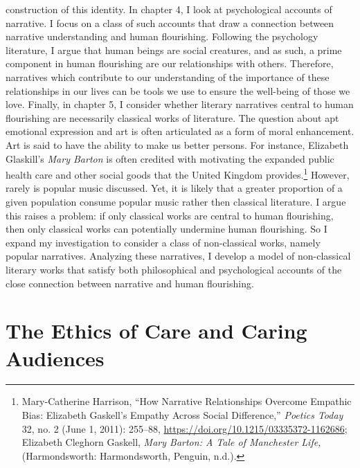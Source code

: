 \documentclass[phdthesis,12pt,final,a4paper]{wuthesis}
\theoremstyle{definition}
\theoremstyle{definition}
\theoremstyle{definition}
\theoremstyle{definition}
\theoremstyle{remark}
\begin{document}
construction of this identity. In chapter 4, I look at psychological accounts of narrative. I focus on a class of such accounts that draw a connection between narrative understanding and human flourishing. Following the psychology literature, I argue that human beings are social creatures, and as such, a prime component in human flourishing are our relationships with others. Therefore, narratives which contribute to our understanding of the importance of these relationships in our lives can be tools we use to ensure the well-being of those we love. Finally, in chapter 5, I consider whether literary narratives central to human flourishing are necessarily classical works of literature. The question about apt emotional expression and art is often articulated as a form of moral enhancement. Art is said to have the ability to make us better persons. For instance, Elizabeth Glaskill's \emph{Mary Barton} is often credited with motivating the expanded public health care and other social goods that the United Kingdom provides.\footnote{Mary-Catherine Harrison, {``How {Narrative Relationships Overcome Empathic Bias}: {Elizabeth Gaskell}'s {Empathy} Across {Social Difference},''} \emph{Poetics Today} 32, no. 2 (June 1, 2011): 255--88, \url{https://doi.org/10.1215/03335372-1162686}; Elizabeth Cleghorn Gaskell, \emph{Mary Barton: A Tale of Manchester Life,} (Harmondsworth: Harmondsworth, Penguin, n.d.).} However, rarely is popular music discussed. Yet, it is likely that a greater proportion of a given population consume popular music rather then classical literature. I argue this raises a problem: if only classical works are central to human flourishing, then only classical works can potentially undermine human flourishing. So I expand my investigation to consider a class of non-classical works, namely popular narratives. Analyzing these narratives, I develop a model of non-classical literary works that satisfy both philosophical and psychological accounts of the close connection between narrative and human flourishing.

\section{The Ethics of Care and Caring Audiences}\label{the-ethics-of-care-and-caring-audiences}
\end{document}

